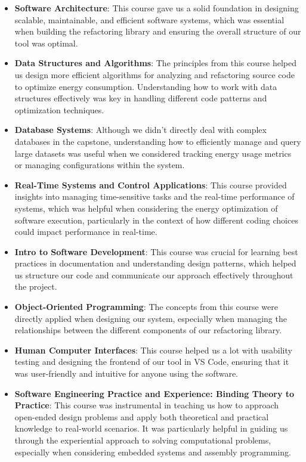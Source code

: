 \documentclass{article}
\begin{document}
\begin{itemize}
    \item \textbf{Software Architecture}: This course gave us a solid foundation in designing 
    scalable, maintainable, and efficient software systems, which was essential when building 
    the refactoring library and ensuring the overall structure of our tool was optimal.
    
    \item \textbf{Data Structures and Algorithms}: The principles from this course helped us 
    design more efficient algorithms for analyzing and refactoring source code to optimize 
    energy consumption. Understanding how to work with data structures effectively was key 
    in handling different code patterns and optimization techniques.
    
    \item \textbf{Database Systems}: Although we didn’t directly deal with complex databases 
    in the capstone, understanding how to efficiently manage and query large datasets was 
    useful when we considered tracking energy usage metrics or managing configurations within 
    the system.
    
    \item \textbf{Real-Time Systems and Control Applications}: This course provided insights 
    into managing time-sensitive tasks and the real-time performance of systems, which was 
    helpful when considering the energy optimization of software execution, particularly in 
    the context of how different coding choices could impact performance in real-time.

    \item \textbf{Intro to Software Development}: This course was crucial for learning best 
    practices in documentation and understanding design patterns, which helped us structure 
    our code and communicate our approach effectively throughout the project.
    
    \item \textbf{Object-Oriented Programming}: The concepts from this course were directly 
    applied when designing our system, especially when managing the relationships between the 
    different components of our refactoring library.
    
    \item \textbf{Human Computer Interfaces}: This course helped us a lot with usability testing 
    and designing the frontend of our tool in VS Code, ensuring that it was user-friendly and 
    intuitive for anyone using the software.
    
    \item \textbf{Software Engineering Practice and Experience: Binding Theory to Practice}: This 
    course was instrumental in teaching us how to approach open-ended design problems and apply 
    both theoretical and practical knowledge to real-world scenarios. It was particularly helpful 
    in guiding us through the experiential approach to solving computational problems, especially 
    when considering embedded systems and assembly programming.
    
\end{itemize}
\end{document}
